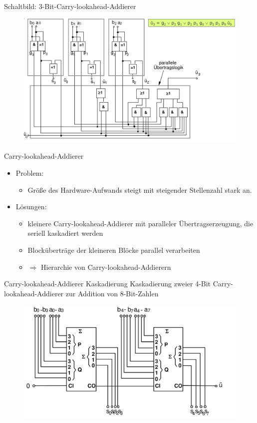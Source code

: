 \documentclass[12pt%
,xcolor=table
,aspectratio=169%
]{beamer}
\begin{document}
\begin{frame}{Schaltbild: 3-Bit-Carry-lookahead-Addierer}
\begin{figure}
\center
\includegraphics[scale=0.3]{pictures/carry_lookahead_adder}
\end{figure}
\end{frame}

\begin{frame}{Carry-lookahead-Addierer}
\begin{itemize}
	\item Problem:
	\begin{itemize}
		\item Größe des Hardware-Aufwands steigt mit steigender Stellenzahl stark an.
	\end{itemize}
	\item Lösungen:
	\begin{itemize}
		\item kleinere Carry-lookahead-Addierer mit paralleler Übertragserzeugung, die seriell kaskadiert werden
		\item Blocküberträge der kleineren Blöcke parallel verarbeiten
		\item $\Rightarrow$ Hierarchie von Carry-lookahead-Addierern
	\end{itemize}
\end{itemize}
\end{frame}

\begin{frame}{Carry-lookahead-Addierer Kaskadierung}
Kaskadierung zweier 4-Bit Carry-lookahead-Addierer zur Addition von 8-Bit-Zahlen
\begin{figure}
\center 
\includegraphics[scale=0.35]{pictures/carry_lookahead_adder2}
\end{figure}
\end{frame}
\end{document}
